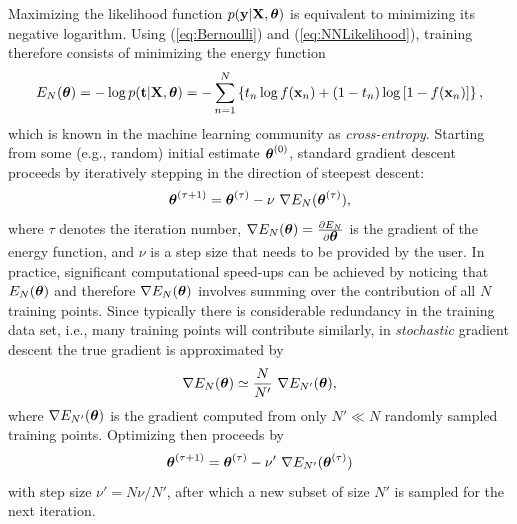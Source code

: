 \documentclass[10pt,twoside]{book}
\begin{document}
Maximizing the likelihood function $p( \mathbf{y} | \mathbf{X}, {\mbox{\boldmath {${\theta}$}}} )$ is equivalent to minimizing its negative logarithm. Using (\eqref{eq:Bernoulli}) and (\eqref{eq:NNLikelihood}), training therefore consists of minimizing the energy function 
\begin{equation}
  E_N( {\mbox{\boldmath {${\theta}$}}} ) 
  = -\log p( \mathbf{t} | \mathbf{X}, {\mbox{\boldmath {${\theta}$}}} )
  = -\sum_{n=1}^N 
  \left\{ 
    t_n \log f(\mathbf{x}_n) + (1-t_n) \log \left[ 1-f(\mathbf{x}_n) \right] 
  \right\}
  \label{eq:crossEntropy}
  ,
\end{equation}
which is known in the machine learning community as \emph{cross-entropy}.
Starting from some (e.g., random) initial estimate ${\mbox{\boldmath {${\theta}$}}}^{(0)}$, standard gradient descent proceeds by 
iteratively stepping in the direction of steepest descent:
$$
  {\mbox{\boldmath {${\theta}$}}}^{(\tau+1)} = 
  {\mbox{\boldmath {${\theta}$}}}^{(\tau)} 
  - \nu \,\,
  \nabla E_N({\mbox{\boldmath {${\theta}$}}}^{(\tau)})
  ,
$$
where $\tau$ denotes the iteration number,
$
\nabla E_N(\bldgr{\theta})
=
\frac{\partial E_N%
  }{\partial \bldgr{\theta}}%
$
is the gradient of the energy function,
and $\nu$ is a step size that needs to be provided by the user.
%
In practice, significant computational speed-ups can be achieved by 
noticing that $E_N({\mbox{\boldmath {${\theta}$}}})$ and therefore $\nabla E_N({\mbox{\boldmath {${\theta}$}}})$
involves summing over the contribution of all $N$ training points.
Since typically there is considerable redundancy in the training data set, 
i.e., many training points will contribute similarly,
in \emph{stochastic} gradient descent the true 
gradient is approximated by
$$
  \nabla E_N({\mbox{\boldmath {${\theta}$}}})
  \simeq 
  \frac{N}{N'} \,\,
  \nabla E_{N'}({\mbox{\boldmath {${\theta}$}}})
  ,
$$
where $\nabla E_{N'}({\mbox{\boldmath {${\theta}$}}})$ is the gradient computed from only $N' \ll N$
randomly sampled training points.
Optimizing then proceeds by
\begin{equation}
  {\mbox{\boldmath {${\theta}$}}}^{(\tau+1)} = 
  {\mbox{\boldmath {${\theta}$}}}^{(\tau)} 
  - \nu' \,\,
  \nabla E_{N'}({\mbox{\boldmath {${\theta}$}}}^{(\tau)})
  \label{eq:stochasticGradientDescent}
\end{equation}
with step size 
$
  \nu' = N\nu/N'
$,
after which
a new subset of size $N'$ is sampled for the next iteration.
\end{document}
